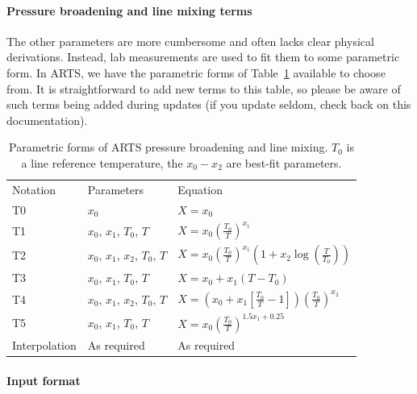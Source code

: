 \paragraph*{Pressure broadening and line mixing terms}

The other parameters are more cumbersome and often lacks clear physical derivations.
Instead, lab measurements are used to fit them to some parametric form.  In ARTS, we
have the parametric forms of Table~\ref{tab:lsalg-parametric-form} available to 
choose from.  It is straightforward to add new terms to this table, so please
be aware of such terms being added during updates (if you update seldom, check
back on this documentation).

\begin{table}[ht!]
 \centering
 \begin{tabular}{lll}
  Notation & Parameters & Equation  \\[5pt]
  T0 & $x_0$ & $X = x_0$ \\[5pt]
  T1 & $x_0$, $x_1$, $T_0$, $T$ & $X = x_0 \left(\frac{T_0}{T}\right)^{x_1}$ \\[5pt]
  T2 & $x_0$, $x_1$, $x_2$, $T_0$, $T$ & $X = x_0\left(\frac{T_0}{T}\right)^{x_1} \left(1 + x_2\log\left(\frac{T}{T_0}\right) \right) $ \\[5pt]
  T3 & $x_0$, $x_1$, $T_0$, $T$ & $X = x_0 + x_1\left(T - T_0\right) $ \\[5pt]
  T4 & $x_0$, $x_1$, $x_2$, $T_0$, $T$ & $X = \left(x_0 + x_1\left[\frac{T_0}{T} - 1\right]\right) \left(\frac{T_0}{T}\right)^{x_2} $ \\[5pt]
  T5 & $x_0$, $x_1$, $T_0$, $T$ & $X = x_0 \left(\frac{T_0}{T}\right)^{1.5x_1+0.25}$ \\[5pt]
  Interpolation & As required & As required
 \end{tabular}
 \caption{Parametric forms of ARTS pressure broadening and line mixing.  $T_0$ is
 a line reference temperature, the $x_0-x_2$ are best-fit parameters.}
 \label{tab:lsalg-parametric-form}
\end{table}

\paragraph*{Input format}

